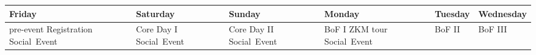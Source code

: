 \begin{tabularx}{\linewidth}{X|X|X|X|X|X}
\bf Friday & \bf Saturday & \bf Sunday & \bf Monday & \bf Tuesday & \bf Wednesday \\\hline
  pre-event \newline
  Registration \newline
  Social~Event
 &
  Core Day I \newline
  Social~Event
 &
  Core Day II \newline
  Social~Event
 &
  BoF I \newline
  ZKM tour \newline
  Social~Event
 &
  BoF II
 &
  BoF III
\end{tabularx}








